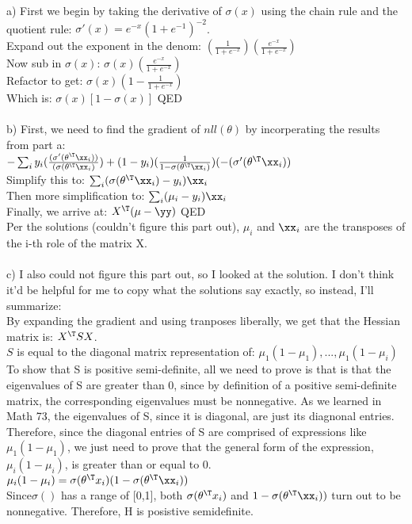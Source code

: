 \documentclass[12pt,letterpaper]{hmcpset}
\begin{document}
\begin{solution}
a) First we begin by taking the derivative of $\sigma(x)$ using the chain rule and the quotient rule: $\sigma'(x) = e^{-x} (1 + e^{-1})^{-2}$. \\
Expand out the exponent in the denom: $(\frac{1}{1+e^{-x}})(\frac{e^{-x}}{1+e^{-x}})$\\
Now sub in $\sigma(x)$: $ \sigma(x)(\frac{e^{-x}}{1+e^{-x}})$\\
Refactor to get: $ \sigma(x)(1 - \frac{1}{1+e^{-x}})$\\ 
Which is:  $\sigma(x)\left[1 - \sigma(x)\right]$ QED
\\ \\
b) First, we need to find the gradient of $nll(\theta)$ by incorperating the results from part a:  \\$
-\sum_{i}y_i (\frac{(\sigma'(\theta^\T \xx_i))}{(\sigma(\theta^\T \xx_i)}) + (1 - y_i)(\frac{1}{1- \sigma(\theta^\T \xx_i)}) (-(\sigma'(\theta^\T \xx_i))
$ \\
Simplify this to: $\sum_{i}(\sigma(\theta^\T \xx_i) - y_i)\xx_i      $\\
Then more simplification to: $ \sum_{i}(\mu_i  - y_i)\xx_i              $\\
Finally, we arrive at: $X^\T(\mu - \yy)$ QED \\
Per the solutions (couldn't figure this part out), $\mu_i $ and $ \xx_i$ are the transposes of the i-th role of the matrix X. \\ \\

c) I also could not figure this part out, so I looked at the solution. I don't think it'd be helpful for me to copy what the solutions say exactly, so instead, I'll summarize: \\
By expanding the gradient and using tranposes liberally, we get that the Hessian matrix is: $X^\T SX$. \\
$S$ is equal to the diagonal matrix representation of: $\mu_1 (1-\mu_1), ..., \mu_1(1-\mu_i)$ \\
To show that S is positive semi-definite, all we need to prove is that is that the eigenvalues of S are greater than 0, since by definition of a positive semi-definite matrix, the corresponding eigenvalues must be nonnegative. As we learned in Math 73, the eigenvalues of S, since it is diagonal, are just its diagnonal entries. Therefore, since the diagonal entries of S are comprised of expressions like $\mu_1 (1-\mu_1)$, we just need to prove that the general form of the expression, $\mu_i (1-\mu_i)$, is greater than or equal to 0. \\
$\mu_i (1-\mu_i) = \sigma(\theta^\T x_i)(1-\sigma(\theta^\T \xx_i))$\\
Since$ \sigma()$ has a range of [0,1], both $ \sigma(\theta^\T x_i)$ and $1-\sigma(\theta^\T \xx_i))$ turn out to be nonnegative. Therefore, H is posistive semidefinite.\\

\end{solution}
\newpage
\end{document}

